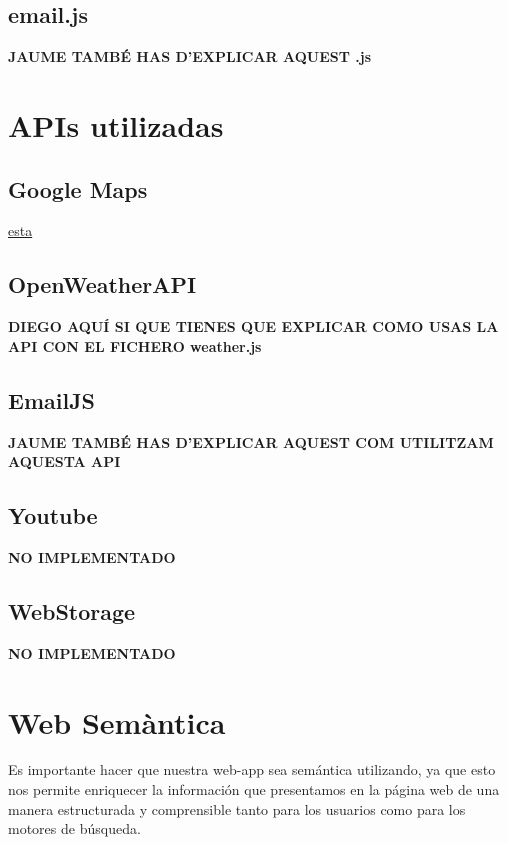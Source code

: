 \documentclass{article}
\begin{document}
\subsection{email.js}
\textbf{JAUME TAMBÉ HAS D'EXPLICAR AQUEST .js}
\section{APIs utilizadas}
\subsection{Google Maps}
\href{https://developers.google.com/maps?hl=es%2F%3Fq%3Dapis%20google}{esta}
\subsection{OpenWeatherAPI}
\textbf{DIEGO AQUÍ SI QUE TIENES QUE EXPLICAR COMO USAS LA API CON EL FICHERO weather.js}
\subsection{EmailJS}
\textbf{JAUME TAMBÉ HAS D'EXPLICAR AQUEST COM UTILITZAM AQUESTA API}
\subsection{Youtube}
\textbf{NO IMPLEMENTADO}
\subsection{WebStorage}
\textbf{NO IMPLEMENTADO}

\section{Web Semàntica}
Es importante hacer que nuestra web-app sea semántica utilizando, ya que esto nos permite enriquecer la información que presentamos en la página web de una manera estructurada y comprensible tanto para los usuarios como para los motores de búsqueda.\\
\end{document}
